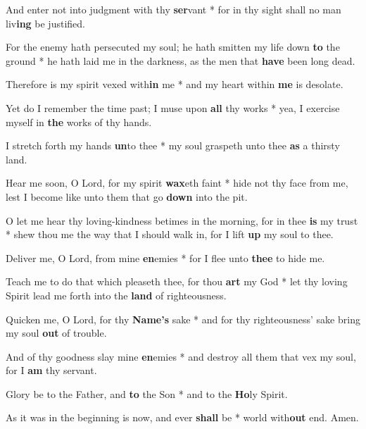 \begin{multicols}{2}
	And enter not into judgment with thy \textbf{ser}vant * for in thy sight shall no man liv\textbf{ing} be justified.
	
	For the enemy hath persecuted my soul; he hath smitten my life down \textbf{to} the ground * he hath laid me in the darkness, as the men that \textbf{have} been long dead.
	
	Therefore is my spirit vexed with\textbf{in} me * and my heart within \textbf{me} is desolate.
	
	Yet do I remember the time past; I muse upon \textbf{all} thy works * yea, I exercise myself in \textbf{the} works of thy hands.
	
	I stretch forth my hands \textbf{un}to thee * my soul graspeth unto thee \textbf{as} a thirsty land.
	
	Hear me soon, O Lord, for my spirit \textbf{wax}eth faint * hide not thy face from me, lest I become like unto them that go \textbf{down} into the pit.
	
	O let me hear thy loving-kindness betimes in the morning, for in thee \textbf{is} my trust * shew thou me the way that I should walk in, for I lift \textbf{up} my soul to thee.
	
	Deliver me, O Lord, from mine \textbf{en}emies * for I flee unto \textbf{thee} to hide me.
	
	Teach me to do that which pleaseth thee, for thou \textbf{art} my God * let thy loving Spirit lead me forth into the \textbf{land} of righteousness.
	
	Quicken me, O Lord, for thy \textbf{Name's} sake * and for thy righteousness' sake bring my soul \textbf{out} of trouble.
	
	And of thy goodness slay mine \textbf{en}emies * and destroy all them that vex my soul, for I \textbf{am} thy servant.
	
	Glory be to the Father, and \textbf{to} the Son * and to the \textbf{Ho}ly Spirit.
	
	As it was in the beginning is now, and ever \textbf{shall} be * world with\textbf{out} end. Amen.
\end{multicols}